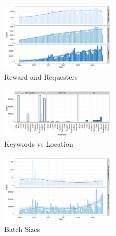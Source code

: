 \begin{figure}[htbp]
	\centering
		\includegraphics[width=0.5\textwidth]{figures/requesters_reward}
	\caption{Reward and Requesters}
	\label{fig:requesters_reward}
\end{figure}



\begin{figure}[htbp]
	\centering
		\includegraphics[width=0.5\textwidth]{figures/keywords_location}
	\caption{Keywords vs Location}
	\label{fig:keyword_loc}
\end{figure}

\begin{figure}[htbp]
	\centering
		\includegraphics[width=0.5\textwidth]{figures/batch_size}
	\caption{Batch Sizes}
	\label{fig:batch_size}
\end{figure}


